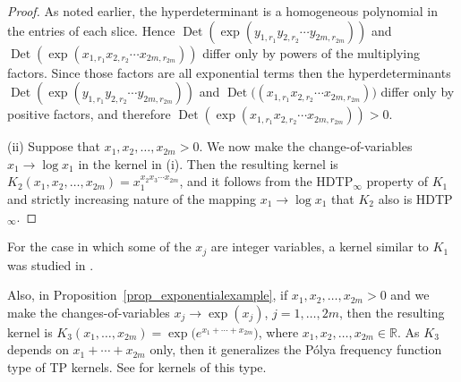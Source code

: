 \documentclass[10pt,a4paper]{amsart}
\numberwithin{equation}{section}
\def\R{{\mathbb R}}
\def\Det{\operatorname{Det}}
\begin{document}
\begin{proof}
As noted earlier, the hyperdeterminant is a homogeneous polynomial in the entries of each slice. Hence $\Det(\exp(y_{1,r_1} y_{2,r_2} \cdots y_{2m,r_{2m}}))$ and $\Det(\exp(x_{1,r_1} x_{2,r_2} \cdots x_{2m,r_{2m}}))$ differ only by powers of the multiplying factors. Since those factors are all exponential terms then the hyperdeterminants $\Det(\exp(y_{1,r_1} y_{2,r_2} \cdots y_{2m,r_{2m}}))$ and $\Det\bigl((x_{1,r_1} x_{2,r_2} \cdots x_{2m,r_{2m}}))$ differ only by positive factors, and therefore $\Det(\exp(x_{1,r_1} x_{2,r_2} \cdots x_{2m,r_{2m}})) > 0$.

(ii) Suppose that $x_1,x_2,\dots,x_{2m} > 0$. We now make the change-of-variables $x_1 \to \log x_1$ in the kernel in (i). Then the resulting kernel is $K_2(x_1,x_2,\dots,x_{2m}) = x_1^{x_2 x_3 \cdots x_{2m}}$, and it follows from the HDTP$_\infty$ property of $K_1$ and strictly increasing nature of the mapping $x_1 \to \log x_1$ that $K_2$ also is HDTP$_\infty$.
\end{proof}


\begin{Remark}
For the case in which some of the $x_j$ are integer variables, a kernel similar to $K_1$ was studied in \cite{wanglixu,xu}.

Also, in Proposition~\ref{prop_exponentialexample}, if $x_1,x_2,\dots,x_{2m} > 0$ and we make the changes-of-variables $x_j \to \exp(x_j)$, $j=1,\dots,2m$, then the resulting kernel is $K_3(x_1,\dots,x_{2m}) = \exp\bigl(e^{x_1 + \cdots + x_{2m}}\bigr)$, where $x_1,x_2,\dots,x_{2m} \in \R$. As $K_3$ depends on $x_1 + \cdots + x_{2m}$ only, then it generalizes the P\'olya frequency function type of TP kernels. See \cite{luquethibon,wanglixu,xu} for kernels of this type.
\end{Remark}
\end{document}
